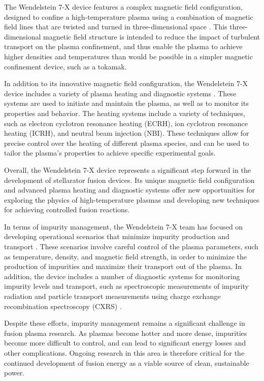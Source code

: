 \documentclass[12pt]{article}
\begin{document}
The Wendelstein 7-X device features a complex magnetic field configuration, designed to confine a high-temperature plasma using a combination of magnetic field lines that are twisted and turned in three-dimensional space \cite{w7x-magnetic-field}. This three-dimensional magnetic field structure is intended to reduce the impact of turbulent transport on the plasma confinement, and thus enable the plasma to achieve higher densities and temperatures than would be possible in a simpler magnetic confinement device, such as a tokamak.

In addition to its innovative magnetic field configuration, the Wendelstein 7-X device includes a variety of plasma heating and diagnostic systems \cite{w7x-heating-systems}. These systems are used to initiate and maintain the plasma, as well as to monitor its properties and behavior. The heating systems include a variety of techniques, such as electron cyclotron resonance heating (ECRH), ion cyclotron resonance heating (ICRH), and neutral beam injection (NBI). These techniques allow for precise control over the heating of different plasma species, and can be used to tailor the plasma's properties to achieve specific experimental goals.

Overall, the Wendelstein 7-X device represents a significant step forward in the development of stellarator fusion devices. Its unique magnetic field configuration and advanced plasma heating and diagnostic systems offer new opportunities for exploring the physics of high-temperature plasmas and developing new techniques for achieving controlled fusion reactions.

In terms of impurity management, the Wendelstein 7-X team has focused on developing operational scenarios that minimize impurity production and transport \cite{w7x-operational-scenarios}. These scenarios involve careful control of the plasma parameters, such as temperature, density, and magnetic field strength, in order to minimize the production of impurities and maximize their transport out of the plasma. In addition, the device includes a number of diagnostic systems for monitoring impurity levels and transport, such as spectroscopic measurements of impurity radiation and particle transport measurements using charge exchange recombination spectroscopy (CXRS) \cite{hutchinson}.

Despite these efforts, impurity management remains a significant challenge in fusion plasma research. As plasmas become hotter and more dense, impurities become more difficult to control, and can lead to significant energy losses and other complications. Ongoing research in this area is therefore critical for the continued development of fusion energy as a viable source of clean, sustainable power.
\end{document}
